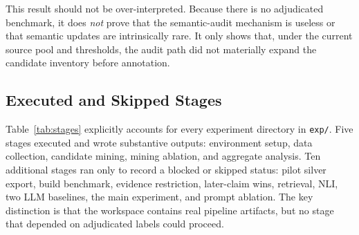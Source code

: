 \documentclass{article}
\begin{document}
This result should not be over-interpreted. Because there is no adjudicated benchmark, it does \emph{not} prove that the semantic-audit mechanism is useless or that semantic updates are intrinsically rare. It only shows that, under the current source pool and thresholds, the audit path did not materially expand the candidate inventory before annotation.

\subsection{Executed and Skipped Stages}

Table~\ref{tab:stages} explicitly accounts for every experiment directory in \texttt{exp/}. Five stages executed and wrote substantive outputs: environment setup, data collection, candidate mining, mining ablation, and aggregate analysis. Ten additional stages ran only to record a blocked or skipped status: pilot silver export, build benchmark, evidence restriction, later-claim wins, retrieval, NLI, two LLM baselines, the main experiment, and prompt ablation. The key distinction is that the workspace contains real pipeline artifacts, but no stage that depended on adjudicated labels could proceed.
\end{document}
